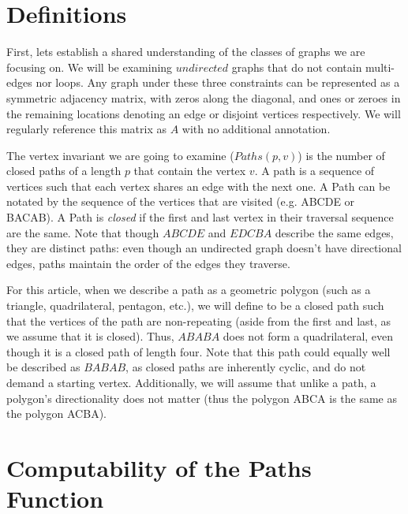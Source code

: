 \documentclass[a4paper,12pt]{article}
\begin{document}
\section*{Definitions}

First, lets establish a shared understanding of the classes of graphs we are focusing on.  We will be examining \(undirected\) graphs that do not contain multi-edges nor loops.  Any graph under these three constraints can be represented as a symmetric adjacency matrix, with zeros along the diagonal, and ones or zeroes in the remaining locations denoting an edge or disjoint vertices respectively. We will regularly reference this matrix as \(A\) with no additional annotation.

The vertex invariant we are going to examine (\(Paths(p, v)\)) is the number of closed paths of a length \(p\) that contain the vertex \(v\). A path is a sequence of vertices such that each vertex shares an edge with the next one. A Path can be notated by the sequence of the vertices that are visited (e.g. ABCDE or BACAB). A Path is \emph{closed} if the first and last vertex in their traversal sequence are the same. Note that though \(ABCDE\) and \(EDCBA\) describe the same edges, they are distinct paths: even though an undirected graph doesn't have directional edges, paths maintain the order of the edges they traverse.

For this article, when we describe a path as a geometric polygon (such as a triangle, quadrilateral, pentagon, etc.), we will define to be a closed path such that the vertices of the path are non-repeating (aside from the first and last, as we assume that it is closed). Thus, \(ABABA\) does not form a quadrilateral, even though it is a closed path of length four. Note that this path could equally well be described as \(BABAB\), as closed paths are inherently cyclic, and do not demand a starting vertex.  Additionally, we will assume that unlike a path, a polygon's directionality does not matter (thus the polygon ABCA is the same as the polygon ACBA). 



\section*{Computability of the Paths Function}
\end{document}
